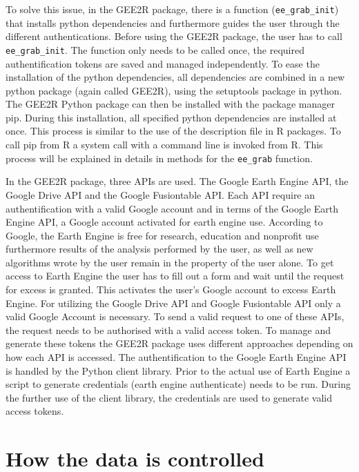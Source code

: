 \documentclass[12pt,twoside,a4paper,final]{report}
\begin{document}
To solve this issue, in the GEE2R package, there is a function (\texttt{ee\_grab\_init}) that installs python dependencies and furthermore guides the user through the different authentications. Before using the GEE2R package, the user has to call \texttt{ee\_grab\_init}. The function only needs to be called once, the required authentification tokens are saved and managed independently. 
To ease the installation of the python dependencies, all dependencies are combined in a new python package (again called GEE2R), using the setuptools package in python. The GEE2R Python package can then be installed with the package manager pip. During this installation, all specified python dependencies are installed at once. This process is similar to the use of the description file in R packages. To call pip from R a system call with a command line is invoked from R. This process will be explained in details in methods for the \texttt{ee\_grab} function. 

In the GEE2R package, three APIs are used. The Google Earth Engine API, the Google Drive API and the Google Fusiontable API. Each API require an authentification with a valid Google account and in terms of the Google Earth Engine API, a Google account activated for earth engine use. According to Google, the Earth Engine is free for research, education and nonprofit use furthermore results of the analysis performed by the user, as well as new algorithms wrote by the user remain in the property of the user alone.
To get access to Earth Engine the user has to fill out a form and wait until the request for excess is granted. This activates the user's Google account to excess Earth Engine. For utilizing the Google Drive API and Google Fusiontable API only a valid Google Account is necessary. To send a valid request to one of these APIs, the request needs to be authorised with a valid access token. To manage and generate these tokens the GEE2R package uses different approaches depending on how each API is accessed. The authentification to the Google Earth Engine API is handled by the Python client library. Prior to the actual use of Earth Engine a script to generate credentials (earth engine authenticate) needs to be run. During the further use of the client library, the credentials are used to generate valid access tokens.



\section{How the data is controlled}
\end{document}

